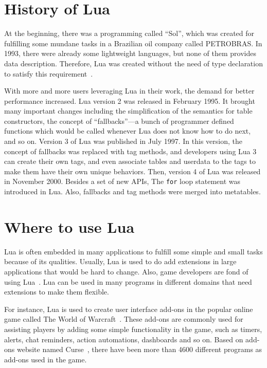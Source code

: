 \section{History of Lua}
At the beginning, there was a programming called ``Sol'', which was created for fulfilling some mundane tasks in a Brazilian oil company called PETROBRAS. In 1993, there were already some lightweight languages, but
none of them provides data description. Therefore, Lua was created without the need of type declaration to satisfy this requirement~\cite{EOL}.

With more and more users leveraging Lua in their work, the demand for better performance increased. Lua version 2 was released in February 1995. It brought many important changes including the simplification of the semantics for table constructors,
the concept of ``fallbacks''---a bunch of programmer defined functions which would be called whenever Lua does not know how to do next, and so on. Version 3 of Lua was published in July 1997. In this version, the concept of fallbacks was replaced with tag methods, and developers using Lua 3 can create their own tags, and even associate tables and userdata to the tags to make them have their own unique behaviors. Then, version 4 of Lua was released in November 2000. Besides a set of new APIs, The {\tt for} loop statement was introduced in Lua. 
Also, fallbacks and tag methods were merged into metatables.

\section{Where to use Lua}
Lua is often embedded in many applications to fulfill some simple and small tasks because of its qualities. Usually, Lua is used to do add extensions in large applications that would be hard to change. Also, game developers are fond of using Lua~\cite{AIL}. Lua can be used in many programs in different domains that need extensions to make them flexible. 

For instance, Lua is used to create user interface add-ons in the popular online game called The World of Warcraft~\cite{WLA}. These add-ons are commonly used for assisting players by adding some simple functionality in the game, such as timers, alerts, chat reminders, action automations, dashboards and so on. Based on add-ons website named Curse~\cite{WCU}, there have been more than 4600 different programs as add-ons used in the game.

